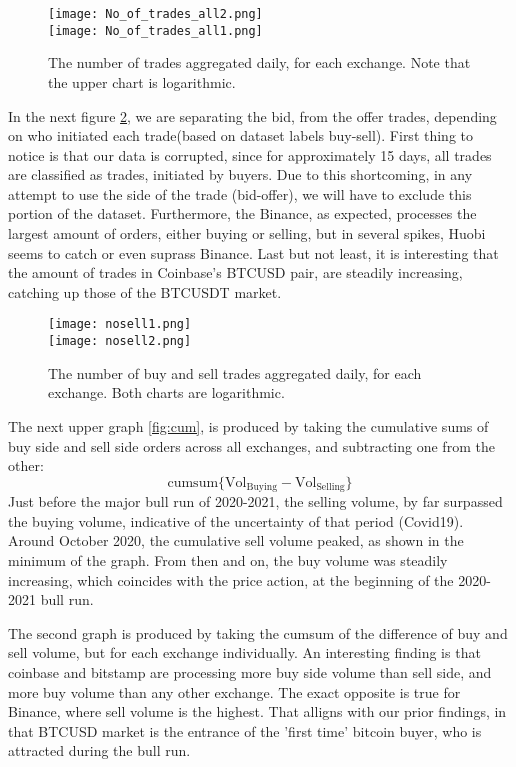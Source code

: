 \begin{figure}[H]
	\centering
    \texttt{[image: No\_of\_trades\_all2.png]} \\
    \texttt{[image: No\_of\_trades\_all1.png]} \\ 
	\caption{The number of trades aggregated daily, for each exchange. Note that the upper chart is logarithmic.}
    \label{fig:nooftrades}
\end{figure}

In the next figure \ref{fig:nooftrades2}, we are separating the bid, from the offer trades, depending on who initiated each trade(based on  dataset labels buy-sell). First thing to notice is that our data is corrupted, since for approximately 15 days, all trades are classified as trades, initiated by buyers. Due to this shortcoming, in any attempt to use the side of the trade (bid-offer), we will have to exclude this portion of the dataset. Furthermore, the Binance, as expected, processes the largest amount of orders, either buying or selling, but in several spikes, Huobi seems to catch or even suprass Binance. Last but not least, it is interesting that the amount of trades in Coinbase's BTCUSD pair, are steadily increasing, catching up those of the BTCUSDT market.

\begin{figure}[H]
	\centering
    \texttt{[image: nosell1.png]} \\
    \texttt{[image: nosell2.png]} \\ 
	\caption{The number of buy and sell trades aggregated daily, for each exchange. Both charts are logarithmic.}
    \label{fig:nooftrades2}
\end{figure}


The next upper graph \ref{fig:cum}, is produced by taking the cumulative sums of buy side and sell side orders across all exchanges, and subtracting one from the other: 
\[ \text{cumsum}\{\text{Vol}_{\text{Buying}} - \text{Vol}_{\text{Selling}}\} \]
Just before the major bull run of 2020-2021, the selling volume, by far surpassed the buying volume, indicative of the uncertainty of that period (Covid19). Around October 2020, the cumulative sell volume peaked, as shown in the minimum of the graph. From then and on, the buy volume was steadily increasing, which coincides with the price action, at the beginning of the 2020-2021 bull run.  

The second graph is produced by taking the cumsum of the difference of buy and sell volume, but for each exchange individually. An interesting finding is that coinbase and bitstamp are processing more buy side volume than sell side, and more buy volume than any other exchange. The exact opposite is true for Binance, where sell volume is the highest. That alligns with our prior findings, in that BTCUSD market is the entrance of the 'first time' bitcoin buyer, who is attracted during the bull run. 


